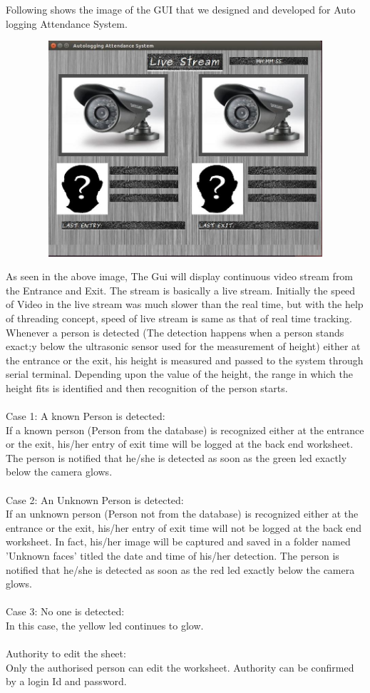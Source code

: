 \documentclass[14pt]{article}
\begin{document}
Following shows the image of the GUI that we designed and developed for Auto logging Attendance System.
\begin{center}
	\graphicspath{ {images/} }
	\includegraphics[width=15cm, height=8cm]{guioapp}
\end{center}
As seen in the above image, The Gui will display continuous video stream from the Entrance and Exit. The stream is basically a live stream. Initially the speed of Video in the live stream was much slower than the real time, but with the help of threading concept, speed of live stream is same as that of real time tracking. Whenever a person is detected (The detection happens when a person stands exact;y below the ultrasonic sensor used for the measurement of height) either at the entrance or the exit, his height is measured and passed to the system through serial terminal.
Depending upon the value of the height, the range in which the height fits is identified and then recognition of the person starts.
\\\\Case 1: A known Person is detected:
\\If a known person (Person from the database) is recognized either at the entrance or the exit,
his/her entry of exit time will be logged at the back end worksheet. The person is notified that
he/she is detected as soon as the green led exactly below the camera glows.
\\\\Case 2: An Unknown Person is detected:
\\If an unknown person (Person not from the database) is recognized either at the entrance or the exit, his/her entry of exit time will not be logged at the back end worksheet. In fact, his/her image will be captured and saved in a folder named 'Unknown faces' titled the date and time of his/her detection. The person is notified that he/she is detected as soon as the red led exactly below the camera glows.
\\\\Case 3: No one is detected: \\
In this case, the yellow led continues to glow.
\\\\Authority to edit the sheet:
\\Only the authorised person can edit the worksheet. Authority can be confirmed by a login Id and password.
\end{document}
